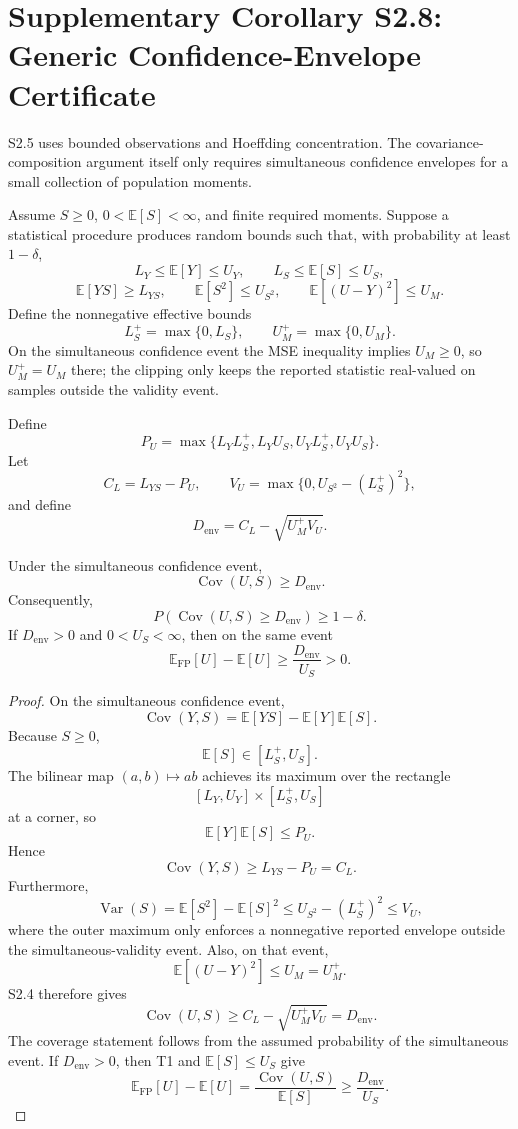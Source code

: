 \section{Supplementary Corollary S2.8: Generic Confidence-Envelope Certificate}

S2.5 uses bounded observations and Hoeffding concentration. The covariance-composition argument itself only requires simultaneous confidence envelopes for a small collection of population moments.

Assume $S\ge0$, $0<\mathbb E[S]<\infty$, and finite required moments. Suppose a statistical procedure produces random bounds such that, with probability at least $1-\delta$,
\[
L_Y\le\mathbb E[Y]\le U_Y,
\qquad
L_S\le\mathbb E[S]\le U_S,
\]
\[
\mathbb E[YS]\ge L_{YS},
\qquad
\mathbb E[S^2]\le U_{S^2},
\qquad
\mathbb E[(U-Y)^2]\le U_M.
\]
Define the nonnegative effective bounds
\[
L_S^+=\max\{0,L_S\},
\qquad
U_M^+=\max\{0,U_M\}.
\]
On the simultaneous confidence event the MSE inequality implies $U_M\ge0$, so $U_M^+=U_M$ there; the clipping only keeps the reported statistic real-valued on samples outside the validity event.

Define
\[
P_U
=
\max\{L_YL_S^+,L_YU_S,U_YL_S^+,U_YU_S\}.
\]
Let
\[
C_L=L_{YS}-P_U,
\qquad
V_U=\max\{0,U_{S^2}-(L_S^+)^2\},
\]
and define
\[
D_{\mathrm{env}}
=
C_L-\sqrt{U_M^+V_U}.
\]

\begin{corollary}
Under the simultaneous confidence event,
\[
\operatorname{Cov}(U,S)
\ge
D_{\mathrm{env}}.
\]
Consequently,
\[
P\!\left(
\operatorname{Cov}(U,S)
\ge D_{\mathrm{env}}
\right)
\ge1-\delta.
\]
If $D_{\mathrm{env}}>0$ and $0<U_S<\infty$, then on the same event
\[
\mathbb E_{\mathrm{FP}}[U]-\mathbb E[U]
\ge
\frac{D_{\mathrm{env}}}{U_S}
>0.
\]
\end{corollary}

\begin{proof}
On the simultaneous confidence event,
\[
\operatorname{Cov}(Y,S)
=
\mathbb E[YS]-\mathbb E[Y]\mathbb E[S].
\]
Because $S\ge0$,
\[
\mathbb E[S]\in[L_S^+,U_S].
\]
The bilinear map $(a,b)\mapsto ab$ achieves its maximum over the rectangle
\[
[L_Y,U_Y]\times[L_S^+,U_S]
\]
at a corner, so
\[
\mathbb E[Y]\mathbb E[S]
\le P_U.
\]
Hence
\[
\operatorname{Cov}(Y,S)
\ge L_{YS}-P_U
=C_L.
\]
Furthermore,
\[
\operatorname{Var}(S)
=
\mathbb E[S^2]-\mathbb E[S]^2
\le
U_{S^2}-(L_S^+)^2
\le V_U,
\]
where the outer maximum only enforces a nonnegative reported envelope outside the simultaneous-validity event. Also, on that event,
\[
\mathbb E[(U-Y)^2]\le U_M=U_M^+.
\]
S2.4 therefore gives
\[
\operatorname{Cov}(U,S)
\ge
C_L-\sqrt{U_M^+V_U}
=D_{\mathrm{env}}.
\]
The coverage statement follows from the assumed probability of the simultaneous event. If $D_{\mathrm{env}}>0$, then T1 and $\mathbb E[S]\le U_S$ give
\[
\mathbb E_{\mathrm{FP}}[U]-\mathbb E[U]
=
\frac{\operatorname{Cov}(U,S)}{\mathbb E[S]}
\ge
\frac{D_{\mathrm{env}}}{U_S}.
\]
\end{proof}


